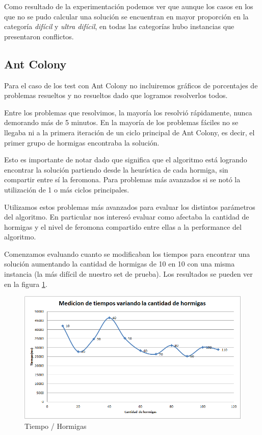 \documentclass[a4paper,spanish]{article}
\begin{document}
Como resultado de la experimentación podemos ver que aunque los casos en los que no se pudo
calcular una solución se encuentran en mayor proporción en la categoría \emph{difícil} y \emph{ultra difícil},
en todas las categorías hubo instancias que presentaron conflictos.


\subsection{Ant Colony}

Para el caso de los test con Ant Colony no incluiremos gráficos de porcentajes de problemas resueltos y
no resueltos dado que logramos resolverlos todos.

Entre los problemas que resolvimos, la mayoría los resolvió rápidamente, nunca demorando más de 5 minutos.
En la mayoría de los problemas fáciles no se llegaba ni a la primera iteración de un ciclo
principal de Ant Colony, es decir, el primer grupo de hormigas encontraba la solución.

Esto es importante de notar dado que significa que el algoritmo está logrando encontrar la solución 
partiendo desde la heurística de cada hormiga, sin compartir entre sí la feromona.
Para problemas más avanzados si se notó la utilización de 1 o más ciclos principales.

Utilizamos estos problemas más avanzados para evaluar los distintos parámetros del algoritmo.
En particular nos interesó evaluar como afectaba la cantidad de hormigas y el nivel de feromona
compartido entre ellas a la performance del algoritmo.

Comenzamos evaluando cuanto se modificaban los tiempos para encontrar una solución aumentando 
la cantidad de hormigas de 10 en 10 con una misma instancia (la más difícil de nuestro set de prueba).
Los resultados se pueden ver en la figura \ref{img:time_ants}.

\begin{figure}[h]
	\centering
	\includegraphics[scale=0.55]{./img/tiempohormigas.png}
	\caption{Tiempo / Hormigas}
	\label{img:time_ants}
\end{figure}
\end{document}
